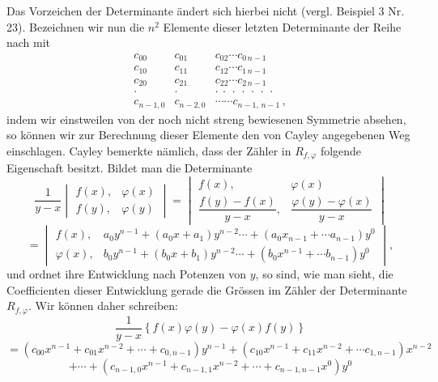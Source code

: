 Das Vorzeichen der Determinante \"andert sich hierbei nicht (vergl.
Beispiel 3 Nr. 23). Bezeichnen wir nun die $n^2$ Elemente dieser letzten
Determinante der Reihe nach mit
\[
\begin{matrix}
c_{00} & c_{01} & c_{02} \cdots c_{0\,n-1} \\
c_{10} & c_{11} & c_{12} \cdots c_{1\,n-1} \\
c_{20} & c_{21} & c_{22} \cdots c_{2\,n-1} \\
\cdot & \cdot & \cdot\ \cdot\ \cdot\ \cdot\ \cdot\ \cdot\ \cdot \\
c_{n-1,0} & c_{n-2,0} & \cdots\cdots c_{n-1,\,n-1}\,,
\end{matrix}
\]
indem wir einstweilen von der noch nicht streng bewiesenen Symmetrie
absehen, so k\"onnen wir zur Berechnung dieser Elemente den von Cayley
angegebenen Weg einschlagen. Cayley bemerkte n\"amlich, dass der Z\"ahler
in $R_{f,\varphi}$ folgende Eigenschaft besitzt. Bildet man die
Determinante
\[
\frac{1}{y-x}
\begin{vmatrix} f(x), & \varphi(x) \\ f(y), & \varphi(y) \end{vmatrix}
=
\begin{vmatrix} f(x), & \varphi(x) \\[4pt]
\dfrac{f(y)-f(x)}{y-x}, & \dfrac{\varphi(y)-\varphi(x)}{y-x} \end{vmatrix}
\]
\[
=
\begin{vmatrix}
f(x), & a_0 y^{n-1} + (a_0 x + a_1) y^{n-2} \cdots + (a_0 x_{n-1} + \cdots a_{n-1}) y^0 \\
\varphi(x), & b_0 y^{n-1} + (b_0 x + b_1) y^{n-2} \cdots + (b_0 x^{n-1} + \cdots b_{n-1}) y^0
\end{vmatrix},
\]
und ordnet ihre Entwicklung nach Potenzen von $y$, so sind, wie man
sieht, die Coefficienten dieser Entwicklung gerade die Gr\"ossen im
Z\"ahler der Determinante $R_{f,\varphi}$. Wir k\"onnen daher schreiben:
\[
\frac{1}{y-x}\left\{f(x)\varphi(y) - \varphi(x)f(y)\right\}
\]
\[
= (c_{00}x^{n-1}+c_{01}x^{n-2}+\cdots+c_{0,n-1})y^{n-1}+(c_{10}x^{n-1}+c_{11}x^{n-2}+\cdots c_{1,n-1})x^{n-2}
\]
\[
+ \cdots + (c_{n-1,0}x^{n-1} + c_{n-1,1}x^{n-2} + \cdots + c_{n-1,n-1}x^0)y^0
\]
